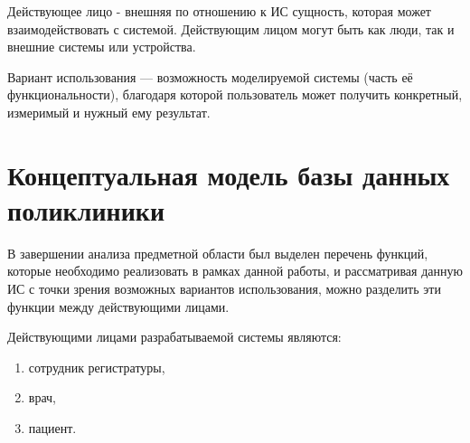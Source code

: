 \documentclass[14pt,a4paper,russian]{extreport}
\begin{document}
Действующее лицо - внешняя по отношению к ИС сущность, которая может
взаимодействовать с системой. Действующим лицом могут быть как люди, так и внешние системы или
устройства.\par
Вариант использования — возможность моделируемой системы (часть её функциональности), благодаря которой
пользователь может получить конкретный, измеримый и нужный ему результат. \cite{dbdesign}


\section{Концептуальная модель базы данных поликлиники}
В завершении анализа предметной области был выделен перечень функций, которые необходимо реализовать
в рамках данной работы, и рассматривая данную ИС с точки зрения возможных вариантов использования, можно 
разделить эти функции между действующими лицами.\par
\noindent Действующими лицами разрабатываемой системы являются:
\begin{enumerate}[noitemsep]
    \item сотрудник регистратуры,
    \item врач,
    \item пациент.    
\end{enumerate}
\end{document}
